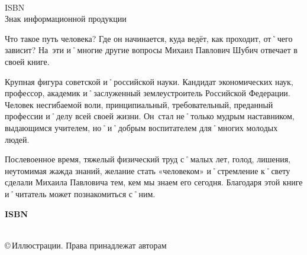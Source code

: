 \begin{titlepage}
	\noindent
	\AuthorMark\hspace{1em}
	\begin{minipage}[t]{\linewidth-1em-\widthof{\AuthorMark}}
		{\hspace{1.5em}\BibInfo\\[1ex]}
		{\hspace{1.5em}ISBN \ISBNShortDash\\}
		{\hspace{1.5em}Знак информационной продукции \large\textbf{\AgeLimit}}
	\end{minipage}
	
	\vfill
	\noindent
	\hspace{1em}\hphantom{\AuthorMark}
	\begin{minipage}[t]{\linewidth-1em-\widthof{\AuthorMark}}
		\footnotesize\hspace{1.5em}	Что такое путь человека? Где он начинается, куда ведёт, как проходит, от˚чего зависит? На~эти и˚многие другие вопросы Михаил Павлович Шубич отвечает в своей книге.

\hspace{1.5em}Крупная фигура советской и˚российской науки. Кандидат экономических наук, профессор, академик и˚заслуженный землеустроитель Российской Федерации. Человек несгибаемой воли, принципиальный, требовательный, преданный профессии и˚делу всей своей жизни. Он~стал не˚только мудрым наставником, выдающимся учителем, но˚и˚добрым воспитателем для˚многих молодых людей.

\hspace{1.5em}Послевоенное время, тяжелый физический труд с˚малых лет, голод, лишения, неутомимая жажда знаний, желание стать «человеком» и˚стремление к˚свету сделали Михаила Павловича тем, кем мы знаем его сегодня. Благодаря этой книге и˚читатель может познакомиться с˚ним.
	\end{minipage}
		
	\noindent	
	\begin{flushright}
		\bibInd{\UDK}{\BBK}{}	
	\end{flushright}
	
	\vfill
	\noindent
	\parbox[b]{.5\linewidth}{\bfseries ISBN \ISBNShortDash}
	\hfill
	\parbox[b]{\widthof{©\,Иллюстрации. Права}}
	{\raggedright
	 \Copyright\\
	 ©\,Иллюстрации. Права принадлежат авторам	
	}
	
\end{titlepage}